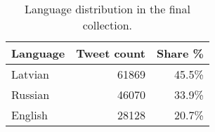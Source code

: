\begin{table}[h]
  \centering
  \begin{tabular}{lrr}
    \toprule
    Language & Tweet count & Share \% \\
    \midrule
    Latvian     & 61869  & 45.5\%  \\
    Russian     & 46070  & 33.9\%  \\
    English     & 28128  & 20.7\%  \\
    \bottomrule
  \end{tabular}
  \caption{Language distribution in the final collection.}
  \label{tab:language-counts}
\end{table}